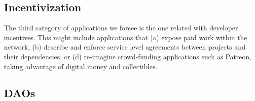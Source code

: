 \subsection{Incentivization}
The third category of applications we forsee is the one related with
developer incentives. This might include applications that (a) expose paid work
within the \oscoin{} network, (b) describe and enforce service level agreements
between projects and their dependencies, or (d) re-imagine crowd-funding
applications such as Patreon, taking advantage of digital money and collectibles.

\subsection{DAOs}

